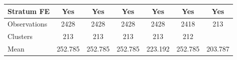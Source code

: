 {\begin{tabular}{l*{6}{c}}
Stratum FE      &      Yes         &      Yes         &      Yes         &      Yes         &      Yes         &      Yes         \\
\midrule
Observations    &     2428         &     2428         &     2428         &     2428         &     2418         &      213         \\
Clusters        &      213         &      213         &      213         &      213         &      212         &                  \\
Mean            &  252.785         &  252.785         &  252.785         &  223.192         &  252.785         &  203.787         \\
\bottomrule
\end{tabular}
}
